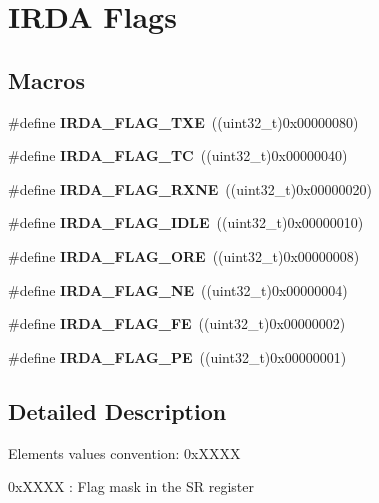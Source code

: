 \hypertarget{group___i_r_d_a___flags}{}\section{I\+R\+DA Flags}
\label{group___i_r_d_a___flags}
\subsection*{Macros}
\begin{DoxyCompactItemize}
\item 
\#define {\bfseries I\+R\+D\+A\+\_\+\+F\+L\+A\+G\+\_\+\+T\+XE}~((uint32\+\_\+t)0x00000080)\hypertarget{group___i_r_d_a___flags_ga88d22267566352225a9ec253d3976b0f}{}\label{group___i_r_d_a___flags_ga88d22267566352225a9ec253d3976b0f}

\item 
\#define {\bfseries I\+R\+D\+A\+\_\+\+F\+L\+A\+G\+\_\+\+TC}~((uint32\+\_\+t)0x00000040)\hypertarget{group___i_r_d_a___flags_gaea9a2c5c33c5fb8e0109801ba005712a}{}\label{group___i_r_d_a___flags_gaea9a2c5c33c5fb8e0109801ba005712a}

\item 
\#define {\bfseries I\+R\+D\+A\+\_\+\+F\+L\+A\+G\+\_\+\+R\+X\+NE}~((uint32\+\_\+t)0x00000020)\hypertarget{group___i_r_d_a___flags_ga044e8008f094da17c9c7371832079a73}{}\label{group___i_r_d_a___flags_ga044e8008f094da17c9c7371832079a73}

\item 
\#define {\bfseries I\+R\+D\+A\+\_\+\+F\+L\+A\+G\+\_\+\+I\+D\+LE}~((uint32\+\_\+t)0x00000010)\hypertarget{group___i_r_d_a___flags_gac15abbde5b08303ceb59b77538e3fbfa}{}\label{group___i_r_d_a___flags_gac15abbde5b08303ceb59b77538e3fbfa}

\item 
\#define {\bfseries I\+R\+D\+A\+\_\+\+F\+L\+A\+G\+\_\+\+O\+RE}~((uint32\+\_\+t)0x00000008)\hypertarget{group___i_r_d_a___flags_gadd2f51365f80ae4ce344ba9eb6ab7b81}{}\label{group___i_r_d_a___flags_gadd2f51365f80ae4ce344ba9eb6ab7b81}

\item 
\#define {\bfseries I\+R\+D\+A\+\_\+\+F\+L\+A\+G\+\_\+\+NE}~((uint32\+\_\+t)0x00000004)\hypertarget{group___i_r_d_a___flags_ga01d432c277dde71d06e3452881affadd}{}\label{group___i_r_d_a___flags_ga01d432c277dde71d06e3452881affadd}

\item 
\#define {\bfseries I\+R\+D\+A\+\_\+\+F\+L\+A\+G\+\_\+\+FE}~((uint32\+\_\+t)0x00000002)\hypertarget{group___i_r_d_a___flags_ga9cfd704788e477a3af6a5df18c957962}{}\label{group___i_r_d_a___flags_ga9cfd704788e477a3af6a5df18c957962}

\item 
\#define {\bfseries I\+R\+D\+A\+\_\+\+F\+L\+A\+G\+\_\+\+PE}~((uint32\+\_\+t)0x00000001)\hypertarget{group___i_r_d_a___flags_ga54e075e6ed11a2b9bd7776ebd049211b}{}\label{group___i_r_d_a___flags_ga54e075e6ed11a2b9bd7776ebd049211b}

\end{DoxyCompactItemize}


\subsection{Detailed Description}
Elements values convention\+: 0x\+X\+X\+XX
\begin{DoxyItemize}
\item 0x\+X\+X\+XX \+: Flag mask in the SR register 
\end{DoxyItemize}